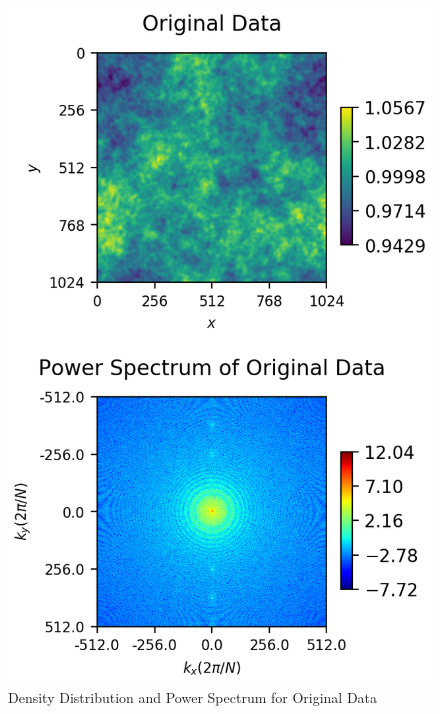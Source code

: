 \documentclass[a4paper,10pt]{article}
\begin{document}
\begin{large}
\begin{figure}[htbp]
\includegraphics[width=13cm]{original.png} %
\caption{Density Distribution and Power Spectrum for Original Data}
\end{figure}


\end{large}
\end{document}
